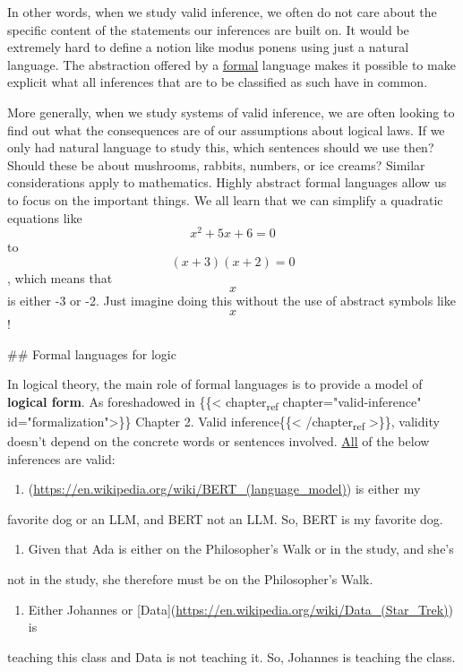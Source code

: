 \documentclass[11pt]{article}
\begin{document}
In other words, when we study valid inference, we often do not care about the specific content of the statements our inferences are built on. It would be extremely hard to define a notion like modus ponens using just a natural language. The abstraction offered by a \uline{formal} language makes it possible to make explicit what all inferences that are to be classified as such have in common.

More generally, when we study systems of valid inference, we are often looking to find out what the consequences are of our assumptions about logical laws.  If we only had natural language to study this, which sentences should we use then? Should these be about mushrooms, rabbits, numbers, or ice creams? Similar considerations apply to mathematics. Highly abstract formal languages allow us to focus on the important things. We all learn that we can simplify a quadratic equations like $$x^2+5x+6=0$$ to $$(x+3)(x+2)=0$$, which means that $$x$$ is either -3 or -2. Just imagine doing this without the use of abstract symbols like $$x$$!

\#\# Formal languages for logic

In logical theory, the main role of formal languages is to provide a model of
\textbf{\textbf{logical form}}. As foreshadowed in \{\{< chapter\textsubscript{ref}
chapter="valid-inference" id="formalization">\}\}
Chapter 2. Valid inference\{\{< /chapter\textsubscript{ref} >\}\}, validity doesn't depend on
the concrete words or sentences involved. \uline{All} of the below inferences are
valid:

\begin{enumerate}
\item\relax [BERT](\url{https://en.wikipedia.org/wiki/BERT\_(language\_model)}) is either my
\end{enumerate}
favorite dog or an LLM, and BERT not an LLM. So, BERT is my favorite dog.

\begin{enumerate}
\item Given that Ada is either on the Philosopher’s Walk or in the study, and she’s
\end{enumerate}
not in the study, she therefore must be on the Philosopher’s Walk.

\begin{enumerate}
\item Either Johannes or [Data](\url{https://en.wikipedia.org/wiki/Data\_(Star\_Trek)}) is
\end{enumerate}
teaching this class and Data is not teaching it. So, Johannes is teaching the
class.
\end{document}
